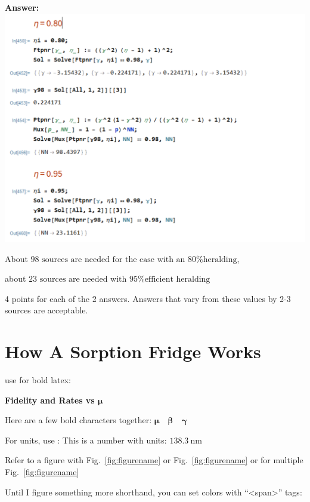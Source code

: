 \documentclass[11pt]{caltech_thesis} %
\begin{document}
\begin{enumerate}
  {\color{midnightblue}  \textbf{Answer:} }
  {\color{midnightblue} \includegraphics{chapter_05/figs_05/pnrTotalPerf.PNG}}

  {\color{midnightblue} About
  \(\boxed{\text{98 sources are needed for the case with an 80\% heralding}}\),
  }

  {\color{midnightblue} about
  \(\boxed{\text{23 sources are needed with 95\% efficient heralding}}\)}

  {\color{darkred}  4 points for each of the 2 answers. Answers that
  vary from these values by 2-3 sources are acceptable. }
\end{enumerate}

\hypertarget{how-a-sorption-fridge-works}{%
\section{How A Sorption Fridge
Works}\label{how-a-sorption-fridge-works}}

use \boldsymbol for bold latex:

\textbf{Fidelity and Rates vs \(\boldsymbol \mu\)}

Here are a few bold characters together:
\(\boldsymbol{\mu \quad \beta \quad \gamma}\)

For units, use : This is a number with units:
\(138.3~\mathrm{nm}\)

Refer to a figure with Fig.~\ref{fig:figurename} or
Fig.~\ref{fig:figurename} or for multiple Fig.~\ref{fig:figurename}

Until I figure something more shorthand, you can set colors with
``\textless span\textgreater{}'' tags:
\end{document}
